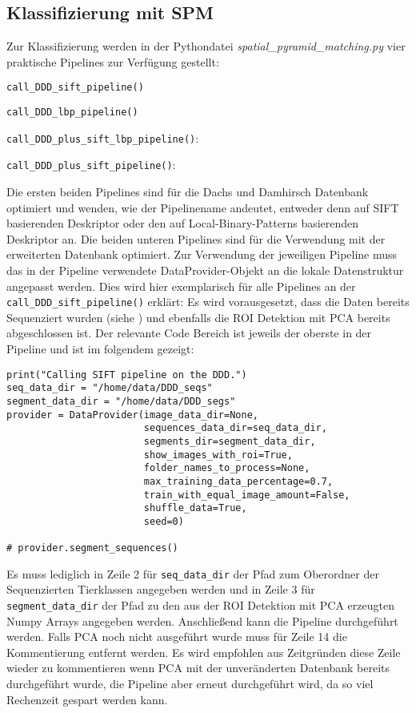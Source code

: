 \subsection*{Klassifizierung mit SPM}
Zur Klassifizierung werden in der Pythondatei \emph{spatial\_pyramid\_matching.py} vier praktische Pipelines zur Verfügung gestellt:
\begin{list}{}{}
\item \texttt{call\_DDD\_sift\_pipeline()}
\item \texttt{call\_DDD\_lbp\_pipeline()}
\item \texttt{call\_DDD\_plus\_sift\_lbp\_pipeline()}:
\item \texttt{call\_DDD\_plus\_sift\_pipeline()}:
\end{list}
Die ersten beiden Pipelines sind für die Dachs und Damhirsch Datenbank optimiert und wenden, wie der Pipelinename andeutet, entweder denn auf SIFT basierenden Deskriptor oder den auf Local-Binary-Patterns basierenden Deskriptor an. Die beiden unteren Pipelines sind für die Verwendung mit der erweiterten Datenbank optimiert.
Zur Verwendung der jeweiligen Pipeline muss das in der Pipeline verwendete DataProvider-Objekt an die lokale Datenstruktur angepasst werden. Dies wird hier exemplarisch für alle Pipelines an der \texttt{call\_DDD\_sift\_pipeline()} erklärt:
Es wird vorausgesetzt, dass die Daten bereits Sequenziert wurden (siehe ) und ebenfalls die ROI Detektion mit PCA bereits abgeschlossen ist. Der relevante Code Bereich ist jeweils der oberste in der Pipeline und ist im folgendem gezeigt:

\begin{verbatim}
print("Calling SIFT pipeline on the DDD.")
seq_data_dir = "/home/data/DDD_seqs"
segment_data_dir = "/home/data/DDD_segs"
provider = DataProvider(image_data_dir=None,
                        sequences_data_dir=seq_data_dir,
                        segments_dir=segment_data_dir,
                        show_images_with_roi=True,
                        folder_names_to_process=None,
                        max_training_data_percentage=0.7,
                        train_with_equal_image_amount=False,
                        shuffle_data=True,
                        seed=0)

# provider.segment_sequences()
\end{verbatim}
Es muss lediglich in Zeile 2 für \texttt{seq\_data\_dir} der Pfad zum Oberordner der Sequenzierten Tierklassen angegeben werden und in Zeile 3 für \texttt{segment\_data\_dir} der Pfad zu den aus der ROI Detektion mit PCA erzeugten Numpy Arrays angegeben werden. Anschließend kann die Pipeline durchgeführt werden. Falls PCA noch nicht ausgeführt wurde muss für Zeile 14 die Kommentierung entfernt werden. Es wird empfohlen aus Zeitgründen diese Zeile wieder zu kommentieren wenn PCA mit der unveränderten Datenbank bereits durchgeführt wurde, die Pipeline aber erneut durchgeführt wird, da so viel Rechenzeit gespart werden kann. 
